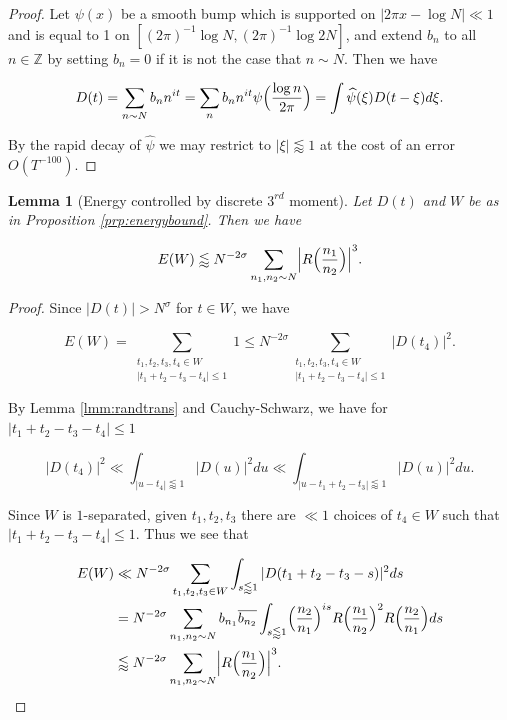 \documentclass{amsart}
\theoremstyle{plain}
\newtheorem{lmm}[thrm]{Lemma}
\numberwithin{equation}{section}
\begin{document}
\begin{proof} 
Let $\psi(x)$ be a smooth bump which is supported on $|2\pi x-\log{N}|\ll 1$ and is equal to 1 on $[(2\pi)^{-1}\log{N},(2\pi)^{-1}\log{2N}]$, and extend $b_n$ to all $n\in \mathbb{Z}$ by setting $b_n=0$ if it is not the case that $n\sim N$. Then we have

\[
D(t)=\sum_{n\sim N}b_n n^{it}=\sum_{n}b_n n^{it} \psi\Bigl(\frac{\log{n}}{2\pi}\Bigr)=\int \widehat{\psi}(\xi) D(t-\xi)d\xi.
\]

By the rapid decay of $\widehat{\psi}$ we may restrict to $|\xi|\lessapprox 1$ at the cost of an error $O(T^{-100})$.
\end{proof}

%
%


\begin{lmm}[Energy controlled by discrete $3^{rd}$ moment]\label{lmm:Energy1}
Let $D(t)$ and $W$  be as in Proposition \ref{prp:energybound}. Then we have 

\[
E(W)\lessapprox N^{-2\sigma}\sum_{n_1,n_2\sim N}\Bigl|R\Bigl(\frac{n_1}{n_2}\Bigr)\Bigr|^3.
\]

\end{lmm}

\begin{proof}
Since $|D(t)|>N^\sigma$ for $t\in W$, we have

\[
E(W)=  \sum_{\substack{t_1, t_2, t_3, t_4 \in W\\  |t_1 + t_2 - t_3 - t_4| \le 1}}1\le N^{-2\sigma} \sum_{\substack{t_1, t_2, t_3, t_4 \in W\\  |t_1 + t_2 - t_3 - t_4| \le 1}}|D(t_4)|^2.
\]

By Lemma \ref{lmm:randtrans} and Cauchy-Schwarz, we have for $|t_1+t_2-t_3-t_4|\le 1$

\[
|D(t_4)|^2\ll \int_{|u-t_4|\lessapprox 1}|D(u)|^2 du \ll \int_{|u-t_1+t_2-t_3|\lessapprox 1}|D(u)|^2 du.
\]

Since $W$ is $1$-separated, given $t_1,t_2,t_3$ there are $\ll 1$ choices of $t_4\in W$ such that $|t_1+t_2-t_3-t_4|\le 1$. Thus we see that

\begin{align*}
E(W)&\ll N^{-2\sigma}\sum_{t_1,t_2,t_3\in W}\int_{s\lessapprox 1}|D(t_1+t_2-t_3-s)|^2ds\\
&= N^{-2\sigma}\sum_{n_1,n_2\sim N}b_{n_1}\overline{b_{n_2}}\int_{s\lessapprox 1}\Bigl(\frac{n_2}{n_1}\Bigr)^{is}R\Bigl(\frac{n_1}{n_2}\Bigr)^2 R\Bigl(\frac{n_2}{n_1}\Bigr)ds\\
&\lessapprox N^{-2\sigma}\sum_{n_1,n_2\sim N}\Bigl|R\Bigl(\frac{n_1}{n_2}\Bigr)\Bigr|^3.\qedhere
\end{align*}
\end{proof}
\end{document}
